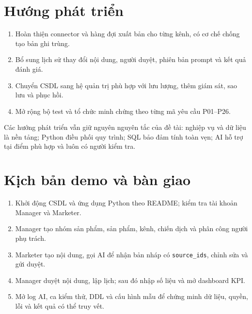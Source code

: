 \section{Hướng phát triển}

\begin{enumerate}
  \item Hoàn thiện connector và hàng đợi xuất bản cho từng kênh, có cơ chế chống tạo bản ghi trùng.
  \item Bổ sung lịch sử thay đổi nội dung, người duyệt, phiên bản prompt và kết quả đánh giá.
  \item Chuyển CSDL sang hệ quản trị phù hợp với lưu lượng, thêm giám sát, sao lưu và phục hồi.
  \item Mở rộng bộ test và tổ chức minh chứng theo từng mã yêu cầu P01--P26.
\end{enumerate}

Các hướng phát triển vẫn giữ nguyên nguyên tắc của đề tài: nghiệp vụ và dữ liệu là nền tảng; Python điều phối quy trình; SQL bảo đảm tính toàn vẹn; AI hỗ trợ tại điểm phù hợp và luôn có người kiểm tra.

\section{Kịch bản demo và bàn giao}

\begin{enumerate}
  \item Khởi động CSDL và ứng dụng Python theo README; kiểm tra tài khoản Manager và Marketer.
  \item Manager tạo nhóm sản phẩm, sản phẩm, kênh, chiến dịch và phân công người phụ trách.
  \item Marketer tạo nội dung, gọi AI để nhận bản nháp có \texttt{source\_ids}, chỉnh sửa và gửi duyệt.
  \item Manager duyệt nội dung, lập lịch; sau đó nhập số liệu và mở dashboard KPI.
  \item Mở log AI, ca kiểm thử, DDL và cấu hình mẫu để chứng minh dữ liệu, quyền, lỗi và kết quả có thể truy vết.
\end{enumerate}
